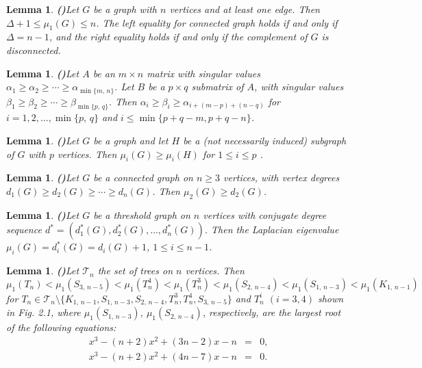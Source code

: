 \documentclass[12pt, a4paper]{article}
\newtheorem{lemma}[theorem]{Lemma}
\begin{document}
\begin{lemma}{\bf (\cite{GM, K})}\label{le2,1} %
Let $G$ be a graph with $n$ vertices and at least one edge. Then $\Delta+1\leq \mu_1(G)\leq n$. The left equality for
connected graph holds if and only if $\Delta=n-1$, and the right equality holds if and only if the complement of $G$ is disconnected.
\end{lemma}



\begin{lemma}{\bf (\cite{T})}\label{le2,2} %
Let $A$ be an $m\times n$ matrix with singular values $\alpha_1\geq \alpha_2\geq \cdots \geq \alpha_{\min\{m,\,n\}}$. Let $B$ be a $p\times q$ submatrix of $A$, with singular values $\beta_1\geq \beta_2\geq \cdots \geq \beta_{\min\{p,\,q\}}$. Then
$\alpha_i\geq \beta_i\geq \alpha_{i+(m-p)+(n-q)}$
for $i=1, 2, \ldots, \min\{p,\,q\}$ and $i\leq \min\{p+q-m, p+q-n\}$.
\end{lemma}


\begin{lemma}{\bf (\cite{BH})}\label{le2,3} %
Let $G$ be a graph and let $H$ be a (not necessarily induced) subgraph of $G$ with $p$ vertices. Then $\mu_i(G)\geq \mu_i(H)$ for $1\leq i\leq p$ .
\end{lemma}


\begin{lemma}{\bf (\cite{LP})}\label{le2,4} %
Let $G$ be a connected graph on $n\geq 3$ vertices, with vertex degrees $d_1(G)\geq d_2(G)\geq \cdots \geq d_n(G)$. Then $\mu_2(G)\geq d_2(G)$.
\end{lemma}



\begin{lemma}{\bf (\cite{M1})}\label{le2,5} %
Let $G$ be a threshold graph on $n$ vertices with conjugate degree sequence $d^{*}=(d_1^*(G), d_2^*(G), \ldots, d_n^*(G))$. Then the Laplacian eigenvalue $\mu_i(G)=d_i^*(G)=d_i(G)+1$, $1\leq i \leq n-1$.
\end{lemma}



\begin{lemma}{\bf (\cite{YLT})}\label{le2,6} %
Let $\mathcal{T}_n$ the set of trees on $n$ vertices. Then
$$\mu_1(T_n)<\mu_1(S_{3,\, n-5})<\mu_1(T_n^4)<\mu_1(T_n^3)<\mu_1(S_{2,\, n-4})<\mu_1(S_{1,\, n-3})<\mu_1(K_{1,\,n-1})$$
for $T_n\in \mathcal{T}_n\setminus \{K_{1,\,n-1}, S_{1,\, n-3}, S_{2,\, n-4}, T_n^3, T_n^4, S_{3,\, n-5} \}$ and $T_n^i$ $(i=3, 4)$ shown in Fig. 2.1, where $\mu_1(S_{1,\, n-3})$, $\mu_1(S_{2,\, n-4})$, respectively, are the largest root of the following equations:
\begin{eqnarray*}
x^3-(n+2)x^2+(3n-2)x-n & = & 0,\\
x^3-(n+2)x^2+(4n-7)x-n & = & 0.
\end{eqnarray*}
\end{lemma}
\end{document}
